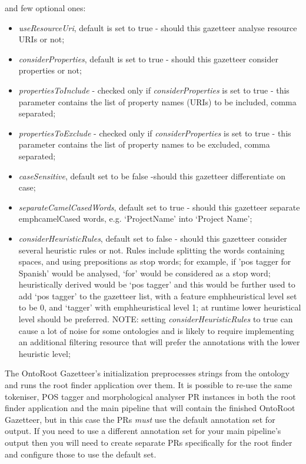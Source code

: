 and few optional ones:
\begin{itemize}
\item \emph{useResourceUri}, default is set to true - should this gazetteer
analyse resource URIs or not;
\item \emph{considerProperties}, default is set to true - should this gazetteer
consider properties or not;
\item \emph{propertiesToInclude} - checked only if \emph{considerProperties} is
set to true - this
  parameter contains the list of property names (URIs) to be included, 
  comma separated;
\item \emph{propertiesToExclude} - checked only if \emph{considerProperties} is
set to true -
  this parameter contains the list of property names to be excluded, comma 
  separated;
\item \emph{caseSensitive}, default set to be false -should this gazetteer
differentiate on case;
\item \emph{separateCamelCasedWords}, default set to true - should this
gazetteer separate emph{camelCased} words, e.g. `ProjectName' into `Project
Name';
\item \emph{considerHeuristicRules}, default set to false - should this
gazetteer consider several heuristic rules or not. Rules include splitting the
words containing spaces, and using prepositions as stop words; for example, if
'pos tagger for Spanish' would be analysed, `for' would be considered as a stop
word; heuristically derived would be `pos tagger' and this would be further
used to add `pos tagger' to the gazetteer list, with a feature emph{heuristical
level} set to be 0, and `tagger' with emph{heuristical
level} 1; at runtime lower heuristical level
should be preferred. NOTE: setting \emph{considerHeuristicRules} to true can
cause a lot of noise for some ontologies and is likely to require implementing
an additional filtering resource that will prefer the annotations with the
lower heuristic level;
\end{itemize}


The OntoRoot Gazetteer's initialization preprocesses strings from the ontology
and runs the root finder application over them.  It is possible to re-use the
same tokeniser, POS tagger and morphological analyser PR instances in both the
root finder application and the main pipeline that will contain the finished
OntoRoot Gazetteer, but in this case the PRs \emph{must} use the default
annotation set for output.  If you need to use a different annotation set for
your main pipeline's output then you will need to create separate PRs
specifically for the root finder and configure those to use the default set.
%

